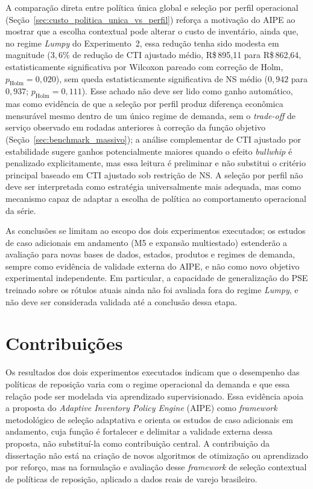 A comparação direta entre política única global e seleção por perfil operacional (Seção~\ref{sec:custo_politica_unica_vs_perfil}) reforça a motivação do AIPE ao mostrar que a escolha contextual pode alterar o custo de inventário, ainda que, no regime \textit{Lumpy} do Experimento~2, essa redução tenha sido modesta em magnitude ($3{,}6\%$ de redução de CTI ajustado médio, R\$\,895,11 para R\$\,862,64, estatisticamente significativa por Wilcoxon pareado com correção de Holm, $p_{\text{Holm}}=0{,}020$), sem queda estatisticamente significativa de NS médio ($0{,}942$ para $0{,}937$; $p_{\text{Holm}}=0{,}111$). Esse achado não deve ser lido como ganho automático, mas como evidência de que a seleção por perfil produz diferença econômica mensurável mesmo dentro de um único regime de demanda, sem o \textit{trade-off} de serviço observado em rodadas anteriores à correção da função objetivo (Seção~\ref{sec:benchmark_massivo}); a análise complementar de CTI ajustado por estabilidade sugere ganhos potencialmente maiores quando o efeito \textit{bullwhip} é penalizado explicitamente, mas essa leitura é preliminar e não substitui o critério principal baseado em CTI ajustado sob restrição de NS. A seleção por perfil não deve ser interpretada como estratégia universalmente mais adequada, mas como mecanismo capaz de adaptar a escolha de política ao comportamento operacional da série.

As conclusões se limitam ao escopo dos dois experimentos executados; os estudos de caso adicionais em andamento (M5 e expansão multiestado) estenderão a avaliação para novas bases de dados, estados, produtos e regimes de demanda, sempre como evidência de validade externa do AIPE, e não como novo objetivo experimental independente. Em particular, a capacidade de generalização do PSE treinado sobre os rótulos atuais ainda não foi avaliada fora do regime \textit{Lumpy}, e não deve ser considerada validada até a conclusão dessa etapa.

\section{Contribuições}

Os resultados dos dois experimentos executados indicam que o desempenho das políticas de reposição varia com o regime operacional da demanda e que essa relação pode ser modelada via aprendizado supervisionado. Essa evidência apoia a proposta do \textit{Adaptive Inventory Policy Engine} (AIPE) como \textit{framework} metodológico de seleção adaptativa e orienta os estudos de caso adicionais em andamento, cuja função é fortalecer e delimitar a validade externa dessa proposta, não substituí-la como contribuição central. A contribuição da dissertação não está na criação de novos algoritmos de otimização ou aprendizado por reforço, mas na formulação e avaliação desse \textit{framework} de seleção contextual de políticas de reposição, aplicado a dados reais de varejo brasileiro.

